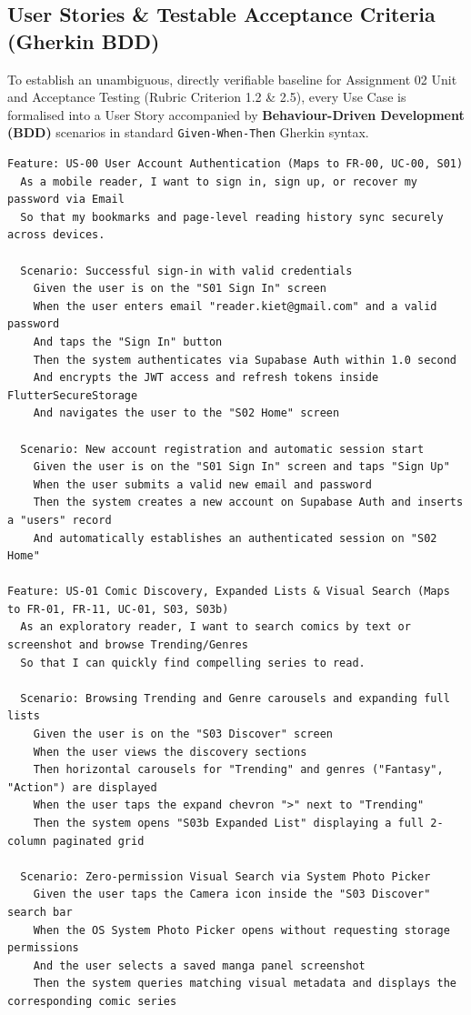 \subsection{User Stories \& Testable Acceptance Criteria (Gherkin BDD)}
\label{subsec:user_stories}

To establish an unambiguous, directly verifiable baseline for Assignment 02 Unit and Acceptance Testing (Rubric Criterion 1.2 \& 2.5), every Use Case is formalised into a User Story accompanied by \textbf{Behaviour-Driven Development (BDD)} scenarios in standard \texttt{Given-When-Then} Gherkin syntax.

\begin{lstlisting}[language=gherkin,caption={US-00 \& US-01: Authentication and Comic Discovery Acceptance Criteria.}]
Feature: US-00 User Account Authentication (Maps to FR-00, UC-00, S01)
  As a mobile reader, I want to sign in, sign up, or recover my password via Email
  So that my bookmarks and page-level reading history sync securely across devices.

  Scenario: Successful sign-in with valid credentials
    Given the user is on the "S01 Sign In" screen
    When the user enters email "reader.kiet@gmail.com" and a valid password
    And taps the "Sign In" button
    Then the system authenticates via Supabase Auth within 1.0 second
    And encrypts the JWT access and refresh tokens inside FlutterSecureStorage
    And navigates the user to the "S02 Home" screen

  Scenario: New account registration and automatic session start
    Given the user is on the "S01 Sign In" screen and taps "Sign Up"
    When the user submits a valid new email and password
    Then the system creates a new account on Supabase Auth and inserts a "users" record
    And automatically establishes an authenticated session on "S02 Home"

Feature: US-01 Comic Discovery, Expanded Lists & Visual Search (Maps to FR-01, FR-11, UC-01, S03, S03b)
  As an exploratory reader, I want to search comics by text or screenshot and browse Trending/Genres
  So that I can quickly find compelling series to read.

  Scenario: Browsing Trending and Genre carousels and expanding full lists
    Given the user is on the "S03 Discover" screen
    When the user views the discovery sections
    Then horizontal carousels for "Trending" and genres ("Fantasy", "Action") are displayed
    When the user taps the expand chevron ">" next to "Trending"
    Then the system opens "S03b Expanded List" displaying a full 2-column paginated grid

  Scenario: Zero-permission Visual Search via System Photo Picker
    Given the user taps the Camera icon inside the "S03 Discover" search bar
    When the OS System Photo Picker opens without requesting storage permissions
    And the user selects a saved manga panel screenshot
    Then the system queries matching visual metadata and displays the corresponding comic series
\end{lstlisting}

